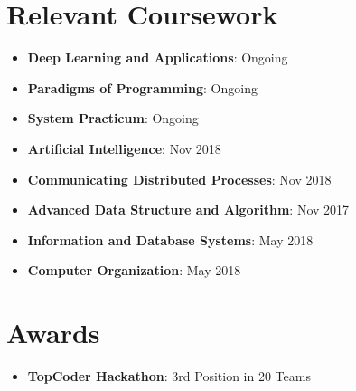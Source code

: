 \documentclass[letterpaper,11pt]{article}
\newcommand{\resumeItem}[2]{
  \item\small{
    \textbf{#1}{: #2 \vspace{-2pt}}
  }
}
\newcommand{\resumeSubItem}[2]{\resumeItem{#1}{#2}\vspace{-4pt}}
\newcommand{\resumeSubHeadingListStart}{\begin{itemize}[leftmargin=*]}
\newcommand{\resumeSubHeadingListEnd}{\end{itemize}}
\begin{document}
\section{Relevant Coursework}
  \resumeSubHeadingListStart
      \resumeSubItem
      {Deep Learning and Applications}{Ongoing}
      \resumeSubItem
      {Paradigms of Programming}{Ongoing}
      \resumeSubItem
      {System Practicum}{Ongoing}
      \resumeSubItem
      {Artificial Intelligence}{Nov 2018}
      \resumeSubItem
      {Communicating Distributed Processes}{Nov 2018}
      \resumeSubItem
      {Advanced Data Structure and Algorithm}{Nov 2017}
      \resumeSubItem
      {Information and Database Systems}{May 2018}
      \resumeSubItem
      {Computer Organization}{May 2018}
    

  \resumeSubHeadingListEnd

\section{Awards}
  \resumeSubHeadingListStart

    \resumeSubItem
    {TopCoder Hackathon}{3rd Position in 20 Teams}

 \resumeSubHeadingListEnd

\end{document}
